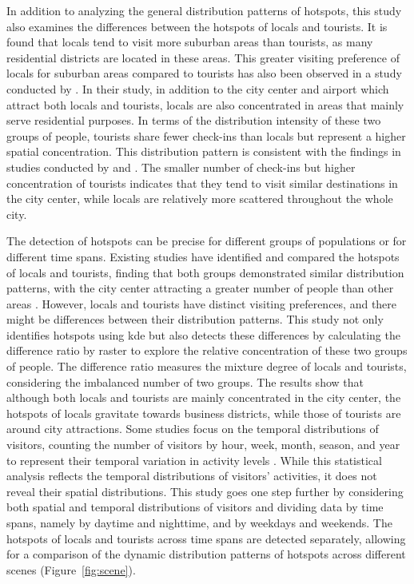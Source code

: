 \documentclass{article}
\theoremstyle{remark}
\begin{document}
In addition to analyzing the general distribution patterns of hotspots, this study also examines the differences between the hotspots of locals and tourists. It is found that locals tend to visit more suburban areas than tourists, as many residential districts are located in these areas. This greater visiting preference of locals for suburban areas compared to tourists has also been observed in a study conducted by \cite{su_analysing_2020}. In their study, in addition to the city center and airport which attract both locals and tourists, locals are also concentrated in areas that mainly serve residential purposes. In terms of the distribution intensity of these two groups of people, tourists share fewer check-ins than locals but represent a higher spatial concentration. This distribution pattern is consistent with the findings in studies conducted by \cite{garcia-palomares_identification_2015} and \cite{su_analysing_2020}. The smaller number of check-ins but higher concentration of tourists indicates that they tend to visit similar destinations in the city center, while locals are relatively more scattered throughout the whole city.

The detection of hotspots can be precise for different groups of populations or for different time spans. Existing studies have identified and compared the hotspots of locals and tourists, finding that both groups demonstrated similar distribution patterns, with the city center attracting a greater number of people than other areas \citep{garcia-palomares_identification_2015,su_analysing_2020}. However, locals and tourists have distinct visiting preferences, and there might be differences between their distribution patterns. This study not only identifies hotspots using \acrshort{kde} but also detects these differences by calculating the difference ratio by raster to explore the relative concentration of these two groups of people. The difference ratio measures the mixture degree of locals and tourists, considering the imbalanced number of two groups. The results show that although both locals and tourists are mainly concentrated in the city center, the hotspots of locals gravitate towards business districts, while those of tourists are around city attractions. Some studies focus on the temporal distributions of visitors, counting the number of visitors by hour, week, month, season, and year to represent their temporal variation in activity levels \citep{li_photography-based_2011,su_analysing_2020}. While this statistical analysis reflects the temporal distributions of visitors' activities, it does not reveal their spatial distributions. This study goes one step further by considering both spatial and temporal distributions of visitors and dividing data by time spans, namely by daytime and nighttime, and by weekdays and weekends. The hotspots of locals and tourists across time spans are detected separately, allowing for a comparison of the dynamic distribution patterns of hotspots across different scenes (Figure~\ref{fig:scene}).
\end{document}
